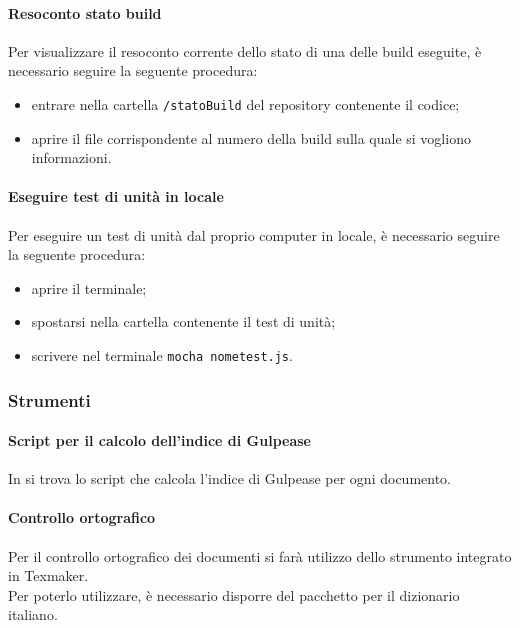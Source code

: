 \paragraph{Resoconto stato build}
Per visualizzare il resoconto corrente dello stato di una delle build eseguite, è necessario seguire la seguente procedura:
\begin{itemize}
	\item entrare nella cartella \texttt{/statoBuild} del repository contenente il codice;
	\item aprire il file corrispondente al numero della build sulla quale si vogliono informazioni.
\end{itemize}
\paragraph{Eseguire test di unità in locale}
Per eseguire un test di unità dal proprio computer in locale, è necessario seguire la seguente procedura:
\begin{itemize}
	\item aprire il terminale;
	\item spostarsi nella cartella contenente il test di unità;
	\item scrivere nel terminale \texttt{mocha nometest.js}.
\end{itemize}

\subsubsection{Strumenti}
\paragraph{Script per il calcolo dell'indice di Gulpease}
In \GulScript{} si trova lo script che calcola l'indice di Gulpease per ogni documento.
\paragraph{Controllo ortografico}
Per il controllo ortografico dei documenti si farà utilizzo dello strumento integrato in Texmaker.\\
Per poterlo utilizzare, è necessario disporre del pacchetto per il dizionario italiano.
